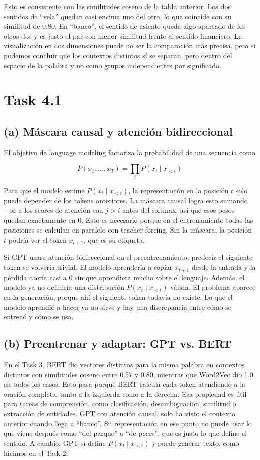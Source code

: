 \documentclass[11pt]{article}
\begin{document}
Esto es consistente con las similitudes coseno de la tabla anterior. Los dos sentidos de ``vela'' quedan casi encima uno del otro, lo que coincide con su similitud de 0.80. En ``banco'', el sentido de asiento queda algo apartado de los otros dos y es justo el par con menor similitud frente al sentido financiero. La visualización en dos dimensiones puede no ser la comparación más precisa, pero si podemos concluir que los contextos distintos sí se separan, pero dentro del espacio de la palabra y no como grupos independientes por significado.

\section*{Task 4.1}

\subsection*{(a) Máscara causal y atención bidireccional}
El objetivo de language modeling factoriza la probabilidad de una secuencia como

\[P(x_1,\dots,x_T)=\prod_t P(x_t\mid x_{<t})\]

Para que el modelo estime \(P(x_t\mid x_{<t})\), la representación en la posición \(t\) solo puede depender de los tokens anteriores. La máscara causal logra esto sumando \(-\infty\) a los scores de atención con \(j>i\) antes del softmax, así que esos pesos quedan exactamente en 0. Esto es necesario porque en el entrenamiento todas las posiciones se calculan en paralelo con teacher forcing. Sin la máscara, la posición \(t\) podría ver el token \(x_{t+1}\), que es su etiqueta.

Si GPT usara atención bidireccional en el preentrenamiento, predecir el siguiente token se volvería trivial. El modelo aprendería a copiar \(x_{t+1}\) desde la entrada y la pérdida caería casi a 0 sin que aprendiera mucho sobre el lenguaje. Además, el modelo ya no definiría una distribución \(P(x_t\mid x_{<t})\) válida. El problema aparece en la generación, porque ahí el siguiente token todavía no existe. Lo que el modelo aprendió a hacer ya no sirve y hay una discrepancia entre cómo se entrenó y cómo se usa.

\subsection*{(b) Preentrenar y adaptar: GPT vs. BERT}
En el Task 3, BERT dio vectores distintos para la misma palabra en contextos distintos con similitudes coseno entre 0.57 y 0.80, mientras que Word2Vec dio 1.0 en todos los casos. Esto pasa porque BERT calcula cada token atendiendo a la oración completa, tanto a la izquierda como a la derecha. Esa propiedad es útil para tareas de comprensión, como clasificación, desambiguación, similitud o extracción de entidades. GPT con atención causal, solo ha visto el contexto anterior cuando llega a ``banco''. Su representación en ese punto no puede usar lo que viene después como ``del parque'' o ``de peces'', que es justo lo que define el sentido. A cambio, GPT sí define \(P(x_t\mid x_{<t})\) y puede generar texto, como hicimos en el Task 2.
\end{document}
